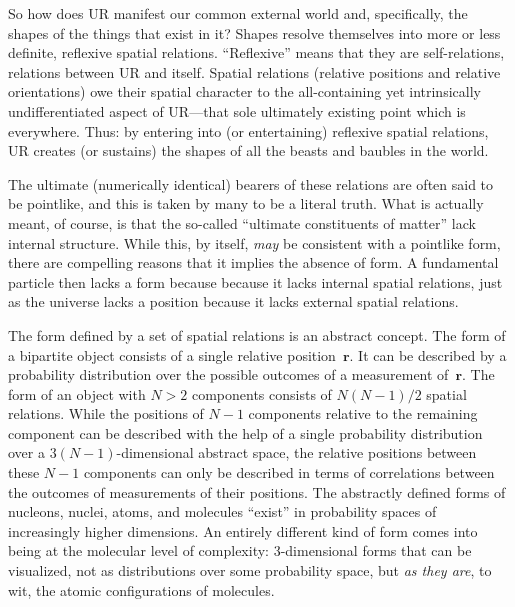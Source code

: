 \documentclass[smallextended]{svjour3}
\begin{document}
So how does UR manifest our common external world and, specifically, the {shapes} of the things that exist in it? Shapes resolve themselves into more or less definite, reflexive spatial relations. ``Reflexive'' means that they are self-relations, relations between UR and itself. Spatial relations (relative positions and relative orientations) owe their spatial character to the all-containing yet intrinsically undifferentiated aspect of UR---that sole ultimately existing point which is everywhere. Thus: by entering into (or entertaining) reflexive spatial relations, UR creates (or sustains) the shapes of all the beasts and baubles in the world.

The ultimate (numerically identical) bearers of these relations are often said to be pointlike, and this is taken by many to be a literal truth. What is actually meant, of course, is that the so-called ``ultimate constituents of matter'' lack internal structure. While this, by itself, \emph{may} be consistent with a pointlike form, there are compelling reasons that it implies the absence of form. A fundamental particle then lacks a form because because it lacks internal spatial relations, just as the universe lacks a position because it lacks external spatial relations.

The form defined by a set of spatial relations is an abstract concept. The form of a bipartite object consists of a single relative position~$\mathbf r$. It can be described by a probability distribution over the possible outcomes of a measurement of~$\mathbf r$. The form of an object with $N>2$ components consists of $N(N{-}1)/2$ spatial relations. While the positions of $N{-}1$ components relative to the remaining component can be described with the help of a single probability distribution over a $3(N{-}1)$-dimensional abstract space, the relative positions between these $N{-}1$ components can only be described in terms of correlations between the outcomes of measurements of their positions. The abstractly defined forms of nucleons, nuclei, atoms, and molecules ``exist'' in probability spaces of increasingly higher dimensions. An entirely different kind of form comes into being at the molecular level of complexity: 3-dimensional forms that can be visualized, not as distributions over some probability space, but \emph{as they are}, to wit, the atomic configurations of molecules.
\end{document}
